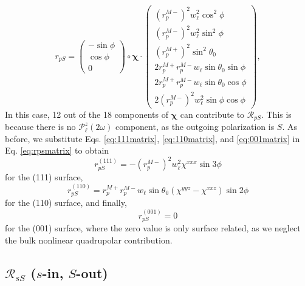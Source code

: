 \documentclass[aps,prb,10pt,showpacs,letterpaper,twocolumn]{revtex4-1}
\begin{document}
{\color{red}
\begin{equation}\label{eq:rpsmatrix}
r_{pS}=
\begin{pmatrix}
-\sin\phi\\
\cos\phi\\
0
\end{pmatrix}
\circ
\boldsymbol{\chi}
\cdot
\begin{pmatrix}
\left(r^{M-}_{p}\right)^{2}w^{2}_{\ell}\cos^{2}\phi\\[8pt]
\left(r^{M-}_{p}\right)^{2}w^{2}_{\ell}\sin^{2}\phi\\[8pt]
\left(r^{M+}_{p}\right)^{2}\sin^{2}\theta_{0}\\[8pt]
2r^{M+}_{p}r^{M-}_{p}w_{\ell}\sin\theta_{0}\sin\phi\\[8pt]
2r^{M+}_{p}r^{M-}_{p}w_{\ell}\sin\theta_{0}\cos\phi\\[8pt]
2\left(r^{M-}_{p}\right)^{2}w^{2}_{\ell}\sin\phi\cos\phi
\end{pmatrix}
,
\end{equation}
In this case, 12 out of the 18 components of $\boldsymbol{\chi}$ can contribute
to $\mathcal{R}_{pS}$. This is because there is no
$\mathcal{P}^{z}_\ell(2\omega)$ component, as the outgoing polarization is $S$.
As before, we substitute Eqs. \eqref{eq:111matrix}, \eqref{eq:110matrix}, and
\eqref{eq:001matrix} in Eq. \eqref{eq:rpsmatrix} to obtain}
\begin{equation}\label{eq:rps111}
r^{(111)}_{pS} = - \left(r^{M-}_{p}\right)^{2}w^{2}_{\ell}\chi^{xxx}\sin3\phi
\end{equation}
for the (111) surface,
\begin{equation}\label{eq:rps110}
r^{(110)}_{pS} =
r^{M+}_{p}r^{M-}_{p}w_{\ell}\sin\theta_{0}(\chi^{yyz} - \chi^{xxz})\sin2\phi
\end{equation}
for the (110) surface, and finally,
\begin{equation}\label{eq:rps001}
r^{(001)}_{pS} = 0
\end{equation}
for the (001) surface, where the zero value is only surface related, as we
neglect the bulk nonlinear quadrupolar contribution.\cite{sipePRB87}



\subsection{\texorpdfstring{$\mathcal{R}_{sS}$ ($s$-in, $S$-out)}{RsS (s-in,
S-out)}}
\label{sec:RsS}
\end{document}
